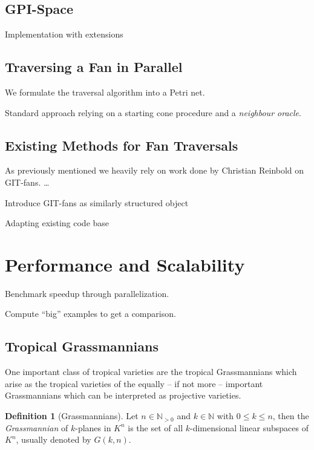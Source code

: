 \documentclass[
  paper=a4,
  DIV=14,
  fontsize=12pt,
  titlepage,
  bibliography=totoc,
  pagesize=pdftex
]{scrartcl}
\numberwithin{figure}{section}
\numberwithin{equation}{section}
\numberwithin{table}{section}
\newcommand*\setN{\mathds{N}}
\theoremstyle{definition}
\newtheorem{definition}{Definition}
\numberwithin{definition}{section}
\begin{document}
\subsection{GPI-Space}

Implementation with extensions

\subsection{Traversing a Fan in Parallel}

We formulate the traversal algorithm into a Petri net.

Standard approach relying on a starting cone procedure and a \emph{neighbour oracle}.

\subsection{Existing Methods for Fan Traversals}

As previously mentioned we heavily rely on work done by Christian Reinbold on GIT-fans.
\dots

Introduce GIT-fans as similarly structured object

Adapting existing code base

\section{Performance and Scalability}

Benchmark speedup through parallelization.

Compute \enquote{big} examples to get a comparison.

\subsection{Tropical Grassmannians}

One important class of tropical varieties are the tropical Grassmannians which arise as
the tropical varieties of the equally -- if not more -- important Grassmannians which can
be interpreted as projective varieties.

\begin{definition}[Grassmannians]
  Let $n \in \setN_{>0}$ and $k \in \setN$ with $0 \leq k \leq n$, then the
  \emph{Grassmannian} of $k$-planes in $K^n$ is the set of all $k$-dimensional linear
  subspaces of $K^n$, usually denoted by $G(k, n)$.
\end{definition}
\end{document}
